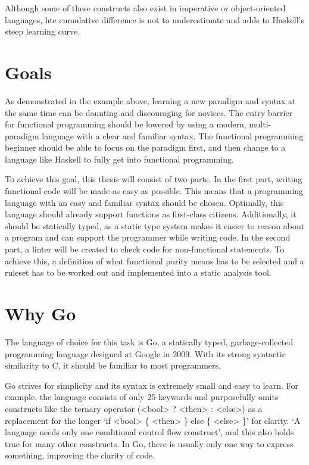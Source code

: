 Although some of these constructs also exist in imperative or object-oriented languages, hte cumulative difference
is not to underestimate and adds to Haskell's steep learning curve.

\section{Goals}

As demonstrated in the example above, learning a new paradigm and syntax at the same time
can be daunting and discouraging for novices.
The entry barrier for functional programming should be lowered by
using a modern, multi-paradigm language with a clear and familiar syntax. The functional
programming beginner should be able to focus on the paradigm first, and then change to a language
like Haskell to fully get into functional programming.

To achieve this goal, this thesis will consist of two parts.
In the first part, writing functional code will be made as easy as possible. This means that
a programming language with an easy and familiar syntax should be chosen. Optimally, this language
should already support functions as first-class citizens. Additionally, it should be statically
typed, as a static type system makes it easier to reason about a program and can support the
programmer while writing code.
In the second part, a linter will be created to check code for non-functional statements. To achieve
this, a definition of what functional purity means has to be selected and a ruleset has to be
worked out and implemented into a static analysis tool.

\section{Why Go}\label{sec:why-go}

The language of choice for this task is Go, a statically typed, garbage-collected programming language
designed at Google in 2009\autocite{golang-publish}. With its strong syntactic similarity to C, it should
be familiar to most programmers.

Go strives for simplicity and its syntax is extremely small and easy to learn. For example, the
language consists of only 25 keywords and purposefully omits constructs like the ternary operator
(<bool> ? <then> : <else>) as a replacement for the longer `if <bool> \{ <then> \} else \{ <else> \}'
for clarity. `A language needs only one conditional control flow construct'\autocite{go-ternary},
and this also holds true for many other constructs. In Go, there is usually only one way
to express something, improving the clarity of code.

